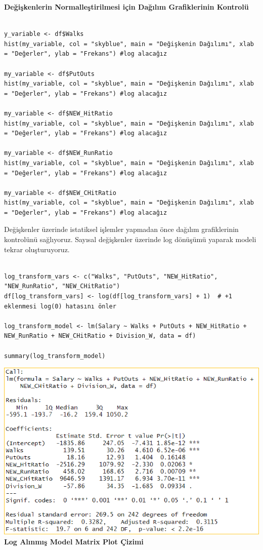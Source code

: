 \documentclass[
]{article}
\begin{document}
\textbf{Değişkenlerin Normalleştirilmesi için Dağılım Grafiklerinin
Kontrolü}

\begin{verbatim}

y_variable <- df$Walks
hist(my_variable, col = "skyblue", main = "Değişkenin Dağılımı", xlab = "Değerler", ylab = "Frekans") #log alacağız

my_variable <- df$PutOuts
hist(my_variable, col = "skyblue", main = "Değişkenin Dağılımı", xlab = "Değerler", ylab = "Frekans") #log alacağız

my_variable <- df$NEW_HitRatio
hist(my_variable, col = "skyblue", main = "Değişkenin Dağılımı", xlab = "Değerler", ylab = "Frekans") #log alacağız

my_variable <- df$NEW_RunRatio
hist(my_variable, col = "skyblue", main = "Değişkenin Dağılımı", xlab = "Değerler", ylab = "Frekans") #log alacağız

my_variable <- df$NEW_CHitRatio
hist(my_variable, col = "skyblue", main = "Değişkenin Dağılımı", xlab = "Değerler", ylab = "Frekans") #log alacağız
\end{verbatim}

Değişkenler üzerinde istatiksel işlemler yapmadan önce dağılım
grafiklerinin kontrolünü sağlıyoruz. Sayısal değişkenler üzerinde log
dönüşümü yaparak modeli tekrar oluşturuyoruz.

\begin{verbatim}

log_transform_vars <- c("Walks", "PutOuts", "NEW_HitRatio", "NEW_RunRatio", "NEW_CHitRatio")
df[log_transform_vars] <- log(df[log_transform_vars] + 1)  # +1 eklenmesi log(0) hatasını önler

log_transform_model <- lm(Salary ~ Walks + PutOuts + NEW_HitRatio + NEW_RunRatio + NEW_CHitRatio + Division_W, data = df)

summary(log_transform_model)
\end{verbatim}

\includegraphics{Picture5.png}\textbf{Log Alınmış Model Matrix Plot
Çizimi}
\end{document}
